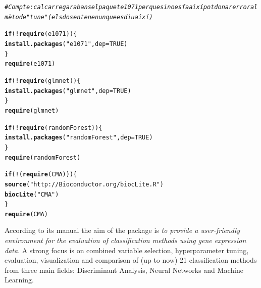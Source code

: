 \documentclass{article}\usepackage[]{graphicx}\usepackage[]{color}
\makeatletter
\newcommand{\hlnum}[1]{\textcolor[rgb]{0.686,0.059,0.569}{#1}}%
\newcommand{\hlstr}[1]{\textcolor[rgb]{0.192,0.494,0.8}{#1}}%
\newcommand{\hlcom}[1]{\textcolor[rgb]{0.678,0.584,0.686}{\textit{#1}}}%
\newcommand{\hlopt}[1]{\textcolor[rgb]{0,0,0}{#1}}%
\newcommand{\hlstd}[1]{\textcolor[rgb]{0.345,0.345,0.345}{#1}}%
\newcommand{\hlkwa}[1]{\textcolor[rgb]{0.161,0.373,0.58}{\textbf{#1}}}%
\newcommand{\hlkwc}[1]{\textcolor[rgb]{0.333,0.667,0.333}{#1}}%
\newcommand{\hlkwd}[1]{\textcolor[rgb]{0.737,0.353,0.396}{\textbf{#1}}}%
\newenvironment{kframe}{%
 \def\at@end@of@kframe{}%
 \ifinner\ifhmode%
  \def\at@end@of@kframe{\end{minipage}}%
  \begin{minipage}{\columnwidth}%
 \fi\fi%
 \def\FrameCommand##1{\hskip\@totalleftmargin \hskip-\fboxsep
 \colorbox{shadecolor}{##1}\hskip-\fboxsep
     \hskip-\linewidth \hskip-\@totalleftmargin \hskip\columnwidth}%
 \MakeFramed {\advance\hsize-\width
   \@totalleftmargin\z@ \linewidth\hsize
   \@setminipage}}%
 {\par\unskip\endMakeFramed%
 \at@end@of@kframe}
\newenvironment{knitrout}{}{} %
\makeatother
\begin{document}
\begin{knitrout}
\color{fgcolor}\begin{kframe}
\begin{alltt}
\hlcom{# Compte: cal carregar abans el paquet e1071 perque si no es fa així pot donar error al mètode "tune" (els dos en tenen un que es diu així)}

\hlkwa{if} \hlstd{(}\hlopt{!}\hlkwd{require}\hlstd{(e1071))\{}
  \hlkwd{install.packages}\hlstd{(}\hlstr{"e1071"}\hlstd{,} \hlkwc{dep}\hlstd{=}\hlnum{TRUE}\hlstd{)}
\hlstd{\}}
\hlkwd{require}\hlstd{(e1071)}

\hlkwa{if} \hlstd{(}\hlopt{!}\hlkwd{require}\hlstd{(glmnet))\{}
  \hlkwd{install.packages}\hlstd{(}\hlstr{"glmnet"}\hlstd{,} \hlkwc{dep}\hlstd{=}\hlnum{TRUE}\hlstd{)}
\hlstd{\}}
\hlkwd{require}\hlstd{(glmnet)}

\hlkwa{if} \hlstd{(}\hlopt{!}\hlkwd{require}\hlstd{(randomForest))\{}
  \hlkwd{install.packages}\hlstd{(}\hlstr{"randomForest"}\hlstd{,} \hlkwc{dep}\hlstd{=}\hlnum{TRUE}\hlstd{)}
\hlstd{\}}
\hlkwd{require}\hlstd{(randomForest)}


\hlkwa{if} \hlstd{(}\hlopt{!}\hlstd{(}\hlkwd{require}\hlstd{(CMA)))\{}
  \hlkwd{source}\hlstd{(}\hlstr{"http://Bioconductor.org/biocLite.R"}\hlstd{)}
  \hlkwd{biocLite}\hlstd{(}\hlstr{"CMA"}\hlstd{)}
\hlstd{\}}
\hlkwd{require}\hlstd{(CMA)}
\end{alltt}
\end{kframe}
\end{knitrout}


According to its manual the aim of the package is \emph{to provide a
user-friendly environment for the evaluation of classification methods
using gene expression data}. A strong focus is on combined variable
selection, hyperparameter tuning, evaluation, visualization and
comparison of (up to now) 21 classification methods from three main
fields: Discriminant Analysis, Neural Networks and Machine Learning.
\end{document}
